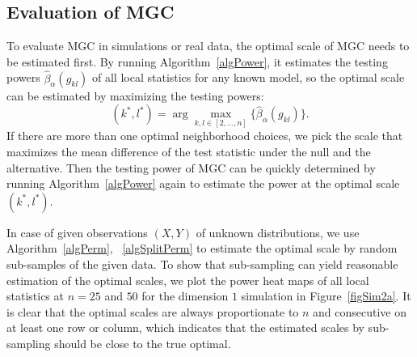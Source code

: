 \documentclass[11pt]{article}
\begin{document}
\subsection{Evaluation of MGC}
\label{appen:eval}

To evaluate MGC in simulations or real data, the optimal scale of MGC needs to be estimated first. By running Algorithm~\ref{algPower}, it estimates the testing powers $\hat{\beta}_{\alpha}(g_{kl})$ of all local statistics for any known model, so the optimal scale can be estimated by maximizing the testing powers:
\begin{equation}
\label{power}
(k^{*},l^{*})=\arg\max_{k,l \in [2,\ldots,n] }\{\hat{\beta}_{\alpha}(g_{kl})\}.
\end{equation}
If there are more than one optimal neighborhood choices, we pick the scale that maximizes the mean difference of the test statistic under the null and the alternative. Then the testing power of MGC can be quickly determined by running Algorithm~\ref{algPower} again to estimate the power at the optimal scale $(k^{*},l^{*})$. 

In case of given observations $(X,Y)$ of unknown distributions, we use Algorithm~\ref{algPerm}, ~\ref{algSplitPerm} to estimate the optimal scale by random sub-samples of the given data. To show that sub-sampling can yield reasonable estimation of the optimal scales, we plot the power heat maps of all local statistics at $n=25$ and $50$ for the dimension $1$ simulation in Figure~\ref{figSim2a}. It is clear that the optimal scales are always proportionate to $n$ and consecutive on at least one row or column, which indicates that the estimated scales by sub-sampling should be close to the true optimal. 
\end{document}
